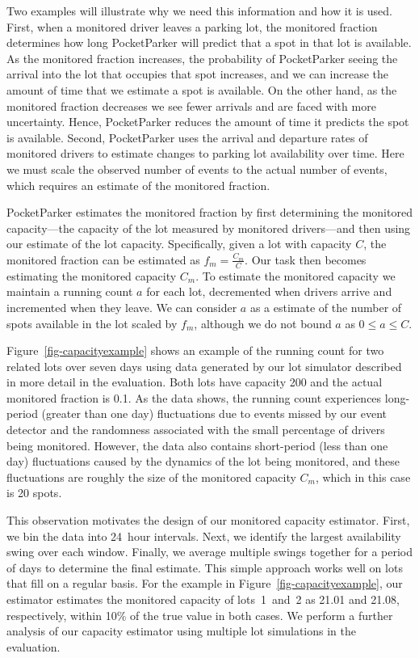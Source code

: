 \documentclass{sigchi}
\begin{document}
Two examples will illustrate why we need this information and how it is used.
First, when a monitored driver leaves a parking lot, the monitored fraction
determines how long PocketParker will predict that a spot in that lot is
available. As the monitored fraction increases, the probability of
PocketParker seeing the arrival into the lot that occupies that spot
increases, and we can increase the amount of time that we estimate a spot is
available. On the other hand, as the monitored fraction decreases we see
fewer arrivals and are faced with more uncertainty. Hence, PocketParker
reduces the amount of time it predicts the spot is available. Second,
PocketParker uses the arrival and departure rates of monitored drivers to
estimate changes to parking lot availability over time. Here we must scale
the observed number of events to the actual number of events, which requires
an estimate of the monitored fraction.

PocketParker estimates the monitored fraction by first determining the
monitored capacity---the capacity of the lot measured by monitored
drivers---and then using our estimate of the lot capacity. Specifically,
given a lot with capacity $C$, the monitored fraction can be estimated as
$f_m = \frac{C_m}{C}$. Our task then becomes estimating the monitored
capacity $C_m$. To estimate the monitored capacity we maintain a running
count $a$ for each lot, decremented when drivers arrive and incremented when
they leave. We can consider $a$ as a estimate of the number of spots
available in the lot scaled by $f_m$, although we do not bound $a$ as $0 \le
a \le C$.

Figure~\ref{fig-capacityexample} shows an example of the running count for
two related lots over seven days using data generated by our lot simulator
described in more detail in the evaluation. Both lots have capacity 200 and
the actual monitored fraction is 0.1. As the data shows, the running count
experiences long-period (greater than one day) fluctuations due to events
missed by our event detector and the randomness associated with the small
percentage of drivers being monitored. However, the data also contains
short-period (less than one day) fluctuations caused by the dynamics of the
lot being monitored, and these fluctuations are roughly the size of the
monitored capacity $C_m$, which in this case is 20 spots.

This observation motivates the design of our monitored capacity estimator.
First, we bin the data into 24~hour intervals. Next, we identify the largest
availability swing over each window. Finally, we average multiple swings
together for a period of days to determine the final estimate. This simple
approach works well on lots that fill on a regular basis. For the example in
Figure~\ref{fig-capacityexample}, our estimator estimates the monitored
capacity of lots~1~and~2 as 21.01 and 21.08, respectively, within 10\% of the
true value in both cases. We perform a further analysis of our capacity
estimator using multiple lot simulations in the evaluation.
\end{document}
